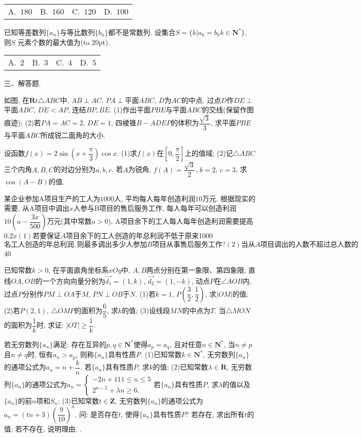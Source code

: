 \documentclass[10pt,a4paper]{article}
\newcommand{\bracket}[1]{(\hbox to #1pt{})}
\newcommand{\fourch}[4]{\par\begin{tabular}{p{.23\textwidth}p{.23\textwidth}p{.23\textwidth}p{.23\textwidth}}
A.~#1 &B.~#2& C.~#3& D.~#4
\end{tabular}}
\begin{document}
	\fourch{$180$}{$160$}{$120$}{$100$}
\item 已知等差数列$\{a_n\}$与等比数列$\{b_n\}$都不是常数列. 设集合$S=\{k|a_k=b_kk\in \mathbf{N}^*\}$, 则$S$	元素个数的最大值为\bracket{20}.
	\fourch{$2$}{$3$}{$4$}{$5$}
三、解答题.
\item 如图, 在$\mathbf{R}t\triangle ABC$中, $AB\perp AC$. $PA\perp$平面$ABC$, $D$为$AC$的中点. 过点$D$作$DE\perp$平面$ABC$, $DE<AP$, 连结$BP,BE$.
(1)作出平面$PBE$与平面$ABC$的交线(保留作图痕迹);
(2)若$PA=AC=2$, $DE=1$, 四棱锥$B-ADEP$的体积为$\dfrac{\sqrt 3}3$, 求平面$PBE$与平面$ABC$所成锐二面角的大小.
\item 设函数$f(x)=2\sin (x+\dfrac{\pi }3)\cos x$.
(1)求$f(x)$在$[0,\dfrac{\pi }2]$上的值域;
	(2)记$\triangle ABC$三个内角$A,B,C$的对边分别为$a,b,c$. 若$A$为锐角, $f(A)=\dfrac{\sqrt 3}2$, $b=2$, $c=3$, 求$\cos (A-B)$的值.
\item 某企业参加A项目生产的工人为$1000$人, 平均每人每年创造利润$10$万元. 根据现实的需要, 从A项目中调出$x$人参与B项目的售后服务工作, 每人每年可以创造利润$10(a-\dfrac{3x}{500})$万元(其中常数$a>0$), A项目余下的工人每人每年创造利润需要提高$0.2x%
(1)若要保证A项目余下的工人创造的年总利润不低于原来$1000$名工人创造的年总利润, 则最多调出多少人参加B项目从事售后服务工作?
	(2)当从A项目调出的人数不超过总人数的$40%
 
\item 已知常数$k>0$, 在平面直角坐标系$xOy$中, $A,B$两点分别在第一象限、第四象限, 直线$OA,OB$的一个方向向量分别为$\overrightarrow{d_1}=(1,k)$, $\overrightarrow{d_2}=(1,-k)$, 动点$P$在$\angle AOB$内, 过点$P$分别作$PM\perp OA$于$M$, $PN\perp OB$于$N$.
(1)若$k=1$, $P(\dfrac 32,\dfrac 12)$, 求$|OM|$的值;
(2)若$P(2,1)$, $\triangle OMP$的面积为$\dfrac 65$, 求$k$的值;
(3)设线段$MN$的中点为$T$. 当$\triangle MON$的面积为$\dfrac 1k$时, 求证: $|OT|\ge \dfrac 1k$.
\item 若无穷数列$\{a_n\}$满足: 存在互异的$p,q\in \mathbf{N}^*$使得$a_p=a_q$, 且对任意$n\in \mathbf{N}^*$, 当$n\ne p$且$n\ne q$时, 恒有$a_n>a_p$, 则称$\{a_n\}$具有性质$P$.
	(1)已知常数$k\in \mathbf{N}^*$, 无穷数列$\{a_n\}$的通项公式为$a_n=n+\dfrac kn$. 若$\{a_n\}$具有性质$P$, 求$k$的值;
	(2)已知常数$\lambda \in \mathbf{R}$, 无穷数列$\{a_n\}$的通项公式为$a_n=\begin{cases} -2n+111\le n\le 5 \\ 2^{n-5}+\lambda n\ge 6. \end{cases}$若$\{a_n\}$具有性质$P$, 求$\lambda$的值以及$\{a_n\}$的前$n$项和$S_n$;
	(3)已知常数$t\in \mathbf{Z}$, 无穷数列$\{a_n\}$的通项公式为$a_n=(tn+3)(\dfrac 9{10})^n$. 问: 是否存在$t$, 使得$\{a_n\}$具有性质$P$? 若存在, 求出所有$t$的值; 若不存在, 说明理由.
.
\end{document}
